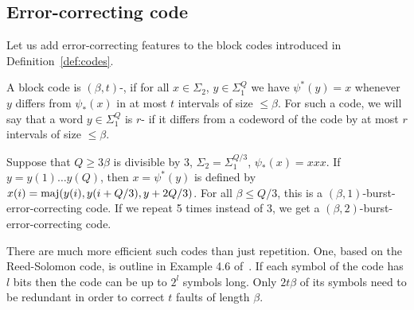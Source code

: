 \documentclass[11pt]{memoir}
\theoremstyle{definition} %
\renewcommand{\le}{\leq}
\renewcommand{\ge}{\geq}
\newcommand{\fld}[1]{\ensuremath{\textit{#1\/}}}
\newcommand{\rul}[1]{\ensuremath{\texttt{#1}}}
\newcommand{\Q}{Q} %
\newcommand{\TransferSw}{\mathrm{TransferSw}}
\newcommand{\Last}{\mathrm{Last}}
\newcommand{\Sweep}{\fld{Sweep}} %
\newcommand{\rHeal}{\rul{Heal}}
\newcommand{\Comp}{\rul{Compute}}
\newcommand{\Transfer}{\rul{Transfer}}
\begin{document}

\subsection{Error-correcting code}\label{sec:coding}

Let us add error-correcting features to the block codes introduced in
Definition~\ref{def:codes}.

\begin{sloppypar}
\begin{definition}\label{def:err-code}
A block code is \( (\beta,t) \)-,
if for all \( x\in\Sigma_{2} \), \( y\in\Sigma_{1}^{\Q} \) we
have \( \psi^{*}(y)=x \) whenever \( y \) differs from
\( \psi_{*}(x) \) in at most \( t \) intervals of size \( \le\beta \).
For such a code, we will say that a word \( y\in\Sigma_{1}^{\Q} \) is \( r \)-
if it differs from a codeword of the code by at most \( r \) intervals of size \( \le\beta \).
\end{definition}
  \end{sloppypar}

\begin{example}\label{xmp:tripling}
  Suppose that \( \Q\ge 3\beta \) is divisible by 3,
  \( \Sigma_{2}=\Sigma_{1}^{\Q/3} \), \( \psi_{*}(x)=xxx \).
  If \( y=y(1)\dots y(\Q) \), then \( x=\psi^{*}(y) \) is defined by
    \( x(i)=\maj(y(i),y(i+\Q/3),y+2\Q/3) \).
    For all \( \beta\le \Q/3 \), this is a
    \( (\beta,1) \)-burst-error-correcting code.
    If we repeat 5 times instead of 3, we get a \( (\beta,2) \)-burst-error-correcting
    code.
  \end{example}

  \begin{example}\label{xmp:Reed-Solomon}
    There are much more efficient such codes than just repetition.
    One, based on the Reed-Solomon code, is outline in Example 4.6
    of~\cite{GacsSorg01}.
    If each symbol of the code has \( l \) bits then the code can be up to \( 2^{l} \) symbols long.
    Only \( 2 t\beta \) of its symbols need to be redundant in order
    to correct \( t \) faults of length \( \beta \).
  \end{example}
\end{document}
